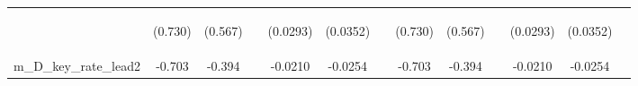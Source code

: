 \documentclass[]{article}
\begin{document}
\begin{center}
\begin{tabular}{lcccccccccccc}
\vspace{4pt} & \begin{footnotesize}(0.730)\end{footnotesize} & \begin{footnotesize}(0.567)\end{footnotesize} & \begin{footnotesize}\end{footnotesize} & \begin{footnotesize}(0.0293)\end{footnotesize} & \begin{footnotesize}(0.0352)\end{footnotesize} & \begin{footnotesize}\end{footnotesize} & \begin{footnotesize}(0.730)\end{footnotesize} & \begin{footnotesize}(0.567)\end{footnotesize} & \begin{footnotesize}\end{footnotesize} & \begin{footnotesize}(0.0293)\end{footnotesize} & \begin{footnotesize}(0.0352)\end{footnotesize} & \begin{footnotesize}\end{footnotesize} \\
m\_D\_key\_rate\_lead2 & -0.703 & -0.394 &  & -0.0210 & -0.0254 &  & -0.703 & -0.394 &  & -0.0210 & -0.0254 &  \\

\end{tabular}
\end{center}
\end{document}

